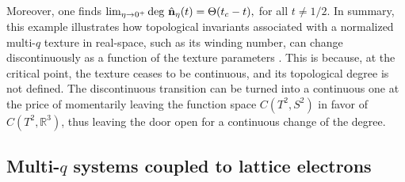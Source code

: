 \documentclass[submission, Phys]{SciPost}
\begin{document}
Moreover, one finds 
$
   \lim_{\eta\to 0^+} \mathrm{deg} ~ \hat{\mathbf{n}}_{\eta}(t) = \Theta(t_c -t),
$
for all $t\neq 1/2$. In summary, this example illustrates how topological invariants associated with a normalized multi-$q$ texture in real-space, such as its winding number,  can change discontinuously as a function of the texture parameters \cite{Hayami2021,Shimizu2022}. 
This is because, at the critical point, the texture ceases to be continuous, and its topological degree is not defined. The discontinuous transition can be turned into a continuous one at the price of momentarily leaving the function space  $C(T^2, S^2)$ in favor of $C(T^2, \mathbb{R}^3)$, thus leaving the door open for a continuous change of the degree.

\subsection{Multi-\texorpdfstring{$q$}{q} systems coupled to lattice electrons}
\label{subsec:multi_q_lattice}
\end{document}
